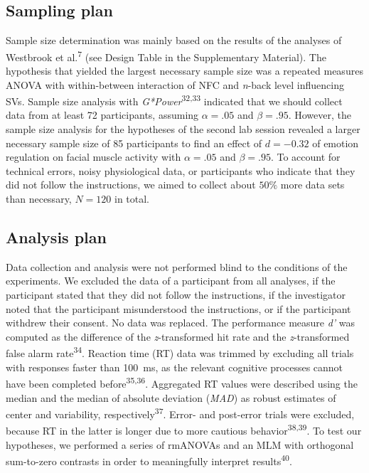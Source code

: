 \documentclass[
  man,floatsintext]{apa6}
\begin{document}
\hypertarget{sampling-plan}{%
\subsection{Sampling plan}\label{sampling-plan}}

Sample size determination was mainly based on the results of the analyses of Westbrook et al.\textsuperscript{7} (see Design Table in the Supplementary Material).
The hypothesis that yielded the largest necessary sample size was a repeated measures ANOVA with within-between interaction of NFC and \emph{n}-back level influencing SVs.
Sample size analysis with \emph{G*Power}\textsuperscript{32,33} indicated that we should collect data from at least 72 participants, assuming \(\alpha=.05\) and \(\beta=.95\).
However, the sample size analysis for the hypotheses of the second lab session revealed a larger necessary sample size of 85 participants to find an effect of \(d=-0.32\) of emotion regulation on facial muscle activity with \(\alpha=.05\) and \(\beta=.95\).
To account for technical errors, noisy physiological data, or participants who indicate that they did not follow the instructions, we aimed to collect about \(50\%\) more data sets than necessary, \(N=120\) in total.

\hypertarget{analysis-plan}{%
\subsection{Analysis plan}\label{analysis-plan}}

Data collection and analysis were not performed blind to the conditions of the experiments.
We excluded the data of a participant from all analyses, if the participant stated that they did not follow the instructions, if the investigator noted that the participant misunderstood the instructions, or if the participant withdrew their consent.
No data was replaced.
The performance measure \emph{d'} was computed as the difference of the \emph{z}-transformed hit rate and the \emph{z}-transformed false alarm rate\textsuperscript{34}.
Reaction time (RT) data was trimmed by excluding all trials with responses faster than 100~ms, as the relevant cognitive processes cannot have been completed before\textsuperscript{35,36}.
Aggregated RT values were described using the median and the median of absolute deviation (\emph{MAD}) as robust estimates of center and variability, respectively\textsuperscript{37}.
Error- and post-error trials were excluded, because RT in the latter is longer due to more cautious behavior\textsuperscript{38,39}.
To test our hypotheses, we performed a series of rmANOVAs and an MLM with orthogonal sum-to-zero contrasts in order to meaningfully interpret results\textsuperscript{40}.
\end{document}
